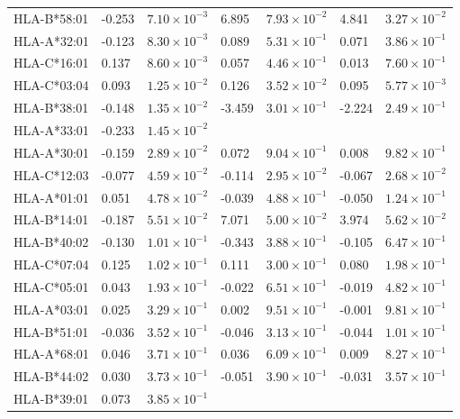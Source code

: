 \documentclass[]{article}
\begin{document}
\begin{doublespace}
\begin{longtable}[H]{p{3cm}p{1cm}p{2cm}p{1cm}p{2cm}p{1cm}p{2cm}}
		HLA-B*58:01 & -0.253 & $7.10 \times 10^{-3}$ & 6.895 & $7.93 \times 10^{-2}$ & 4.841 & $3.27 \times 10^{-2}$ \\ 
		HLA-A*32:01 & -0.123 & $8.30 \times 10^{-3}$ & 0.089 & $5.31 \times 10^{-1}$ & 0.071 & $3.86 \times 10^{-1}$ \\ 
		HLA-C*16:01 & 0.137 & $8.60 \times 10^{-3}$ & 0.057 & $4.46 \times 10^{-1}$ & 0.013 & $7.60 \times 10^{-1}$ \\ 
		HLA-C*03:04 & 0.093 & $1.25 \times 10^{-2}$ & 0.126 & $3.52 \times 10^{-2}$ & 0.095 & $5.77 \times 10^{-3}$ \\ 
		HLA-B*38:01 & -0.148 & $1.35 \times 10^{-2}$ & -3.459 & $3.01 \times 10^{-1}$ & -2.224 & $2.49 \times 10^{-1}$ \\ 
		HLA-A*33:01 & -0.233 & $1.45 \times 10^{-2}$ &  &  &  &  \\ 
		HLA-A*30:01 & -0.159 & $2.89 \times 10^{-2}$ & 0.072 & $9.04 \times 10^{-1}$ & 0.008 & $9.82 \times 10^{-1}$ \\ 
		HLA-C*12:03 & -0.077 & $4.59 \times 10^{-2}$ & -0.114 & $2.95 \times 10^{-2}$ & -0.067 & $2.68 \times 10^{-2}$ \\ 
		HLA-A*01:01 & 0.051 & $4.78 \times 10^{-2}$ & -0.039 & $4.88 \times 10^{-1}$ & -0.050 & $1.24 \times 10^{-1}$ \\ 
		HLA-B*14:01 & -0.187 & $5.51 \times 10^{-2}$ & 7.071 & $5.00 \times 10^{-2}$ & 3.974 & $5.62 \times 10^{-2}$ \\ 
		HLA-B*40:02 & -0.130 & $1.01 \times 10^{-1}$ & -0.343 & $3.88 \times 10^{-1}$ & -0.105 & $6.47 \times 10^{-1}$ \\ 
		HLA-C*07:04 & 0.125 & $1.02 \times 10^{-1}$ & 0.111 & $3.00 \times 10^{-1}$ & 0.080 & $1.98 \times 10^{-1}$ \\ 
		HLA-C*05:01 & 0.043 & $1.93 \times 10^{-1}$ & -0.022 & $6.51 \times 10^{-1}$ & -0.019 & $4.82 \times 10^{-1}$ \\ 
		HLA-A*03:01 & 0.025 & $3.29 \times 10^{-1}$ & 0.002 & $9.51 \times 10^{-1}$ & -0.001 & $9.81 \times 10^{-1}$ \\ 
		HLA-B*51:01 & -0.036 & $3.52 \times 10^{-1}$ & -0.046 & $3.13 \times 10^{-1}$ & -0.044 & $1.01 \times 10^{-1}$ \\ 
		HLA-A*68:01 & 0.046 & $3.71 \times 10^{-1}$ & 0.036 & $6.09 \times 10^{-1}$ & 0.009 & $8.27 \times 10^{-1}$ \\ 
		HLA-B*44:02 & 0.030 & $3.73 \times 10^{-1}$ & -0.051 & $3.90 \times 10^{-1}$ & -0.031 & $3.57 \times 10^{-1}$ \\ 
		HLA-B*39:01 & 0.073 & $3.85 \times 10^{-1}$ &  &  &  &  \\ 

\end{longtable}
\end{doublespace}
\end{document}

